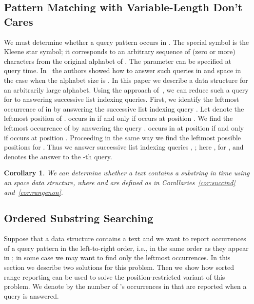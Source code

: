 \documentclass[11pt]{article}
\newcommand{\nono}[1]{}
\newtheorem{corollary}{Corollary}
\begin{document}
\subsection{Pattern Matching with Variable-Length Don't Cares}
\label{sec:regpat}
We must determine whether a query pattern  
occurs in . The special symbol  is the Kleene star
 symbol; it corresponds to an arbitrary sequence of (zero or more) 
characters from the original alphabet of .
The parameter  can be specified at query time. 
In~\cite{YuWK10} the authors showed how to answer such queries in 
 and  space in the case when the alphabet size 
is . In this paper we describe  a data structure 
for an arbitrarily large alphabet.
Using the approach of~\cite{YuWK10}, we can reduce such a query for   
to answering  successive list indexing queries.  
First, we identify the leftmost occurrence of  in  by answering 
the successive list indexing query . 
Let  denote the leftmost position of .  
 occurs in  if and only if  occurs at position . We find the leftmost occurrence
  of  by answering the query .  
 occurs in  at position  
if and only if  occurs at position . 
Proceeding in the same way we find the leftmost possible positions 
for . Thus we answer  successive list indexing 
queries , ; here ,  
for , and  denotes the answer to the -th query.
\begin{corollary}\label{cor:dontcares}
We can determine whether a text  contains a substring    in  time using an  space data structure, where  and  are defined as in Corollaries~\ref{cor:succind} and~\ref{cor:rangenon}.
\end{corollary}
\nono{Further applications of sorted range reporting and orthogonal range successor queries are discussed in the full version of this 
paper~\cite{NN12full}.}


\subsection{Ordered Substring Searching}
\label{sec:sortsubstr}
Suppose that a data structure contains a text  and we want to report 
occurrences of a query pattern  in the left-to-right order, i.e., in the 
same order as they appear in ; in some case we may want to find only 
the  leftmost occurrences.
 In this section we describe two solutions for this problem. Then we show how sorted range reporting 
can be used to solve the position-restricted variant of this problem. We denote by  the number of 's occurrences in  that are reported when a query is answered.
\end{document}
